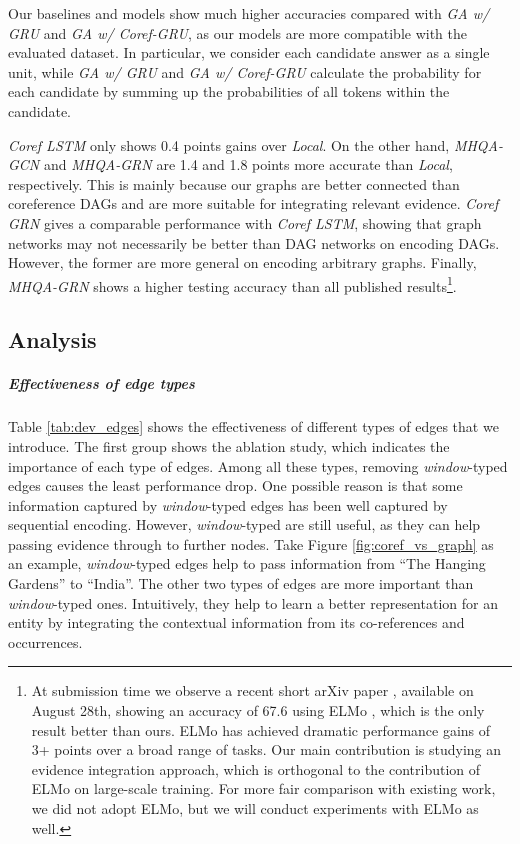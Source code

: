 \documentclass[letterpaper]{article}
\begin{document}
Our baselines and models show much higher accuracies compared with \emph{GA w/ GRU} and \emph{GA w/ Coref-GRU}, as our models are more compatible with the evaluated dataset.
In particular, we consider each candidate answer as a single unit, while \emph{GA w/ GRU} and \emph{GA w/ Coref-GRU} calculate the probability for each candidate by summing up the probabilities of all tokens within the candidate. 




\emph{Coref LSTM} only shows 0.4 points gains over \emph{Local}.
On the other hand, \emph{MHQA-GCN} and \emph{MHQA-GRN} are 1.4 and 1.8 points more accurate than \emph{Local}, respectively.
This is mainly because our graphs are better connected than coreference DAGs and are more suitable for integrating relevant evidence.
\emph{Coref GRN} gives a comparable performance with \emph{Coref LSTM}, showing that graph networks may not necessarily be better than DAG networks on encoding DAGs.
However, the former are more general on encoding arbitrary graphs.
Finally, \emph{MHQA-GRN} shows a higher testing accuracy than all published results\footnote{At submission time we observe a recent short arXiv paper \citep{gcnwiki}, available on August 28th, showing an accuracy of 67.6 using ELMo \citep{peters2018deep}, which is the only result better than ours.
ELMo has achieved dramatic performance gains of 3+ points over a broad range of tasks.
Our main contribution is studying an evidence integration approach, which is orthogonal to the contribution of ELMo on large-scale training.
For more fair comparison with existing work, we did not adopt ELMo, but we will conduct experiments with ELMo as well.}.


\subsection{Analysis}


\subparagraph{Effectiveness of edge types}
Table \ref{tab:dev_edges} shows the effectiveness of different types of edges that we introduce.
The first group shows the ablation study, which indicates the importance of each type of edges.
Among all these types, removing \emph{window}-typed edges causes the least performance drop.
One possible reason is that some information captured by \emph{window}-typed edges has been well captured by sequential encoding.
However, \emph{window}-typed are still useful, as they can help passing evidence through to further nodes.
Take Figure \ref{fig:coref_vs_graph} as an example, \emph{window}-typed edges help to pass information from ``The Hanging Gardens'' to ``India''.
The other two types of edges are more important than \emph{window}-typed ones.
Intuitively, they help to learn a better representation for an entity by integrating the contextual information from its co-references and occurrences.
\end{document}

